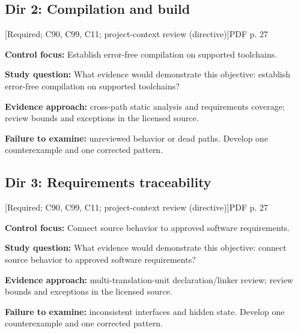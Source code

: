 \documentclass[10pt,letterpaper]{article}
\begin{document}
\subsection{Dir 2: Compilation and build}
 \textsf{\footnotesize [Required; C90, C99, C11; project-context review (directive)]}\hfill{\footnotesize PDF p. 27}\par
\textbf{Control focus:} Establish error-free compilation on supported toolchains.\par
\textbf{Study question:} What evidence would demonstrate this objective: establish error-free compilation on supported toolchains?\par
\textbf{Evidence approach:} cross-path static analysis and requirements coverage; review bounds and exceptions in the licensed source.\par
\textbf{Failure to examine:} unreviewed behavior or dead paths. Develop one counterexample and one corrected pattern.\par
\smallskip
\subsection{Dir 3: Requirements traceability}
 \textsf{\footnotesize [Required; C90, C99, C11; project-context review (directive)]}\hfill{\footnotesize PDF p. 27}\par
\textbf{Control focus:} Connect source behavior to approved software requirements.\par
\textbf{Study question:} What evidence would demonstrate this objective: connect source behavior to approved software requirements?\par
\textbf{Evidence approach:} multi-translation-unit declaration/linker review; review bounds and exceptions in the licensed source.\par
\textbf{Failure to examine:} inconsistent interfaces and hidden state. Develop one counterexample and one corrected pattern.\par
\smallskip
\end{document}
